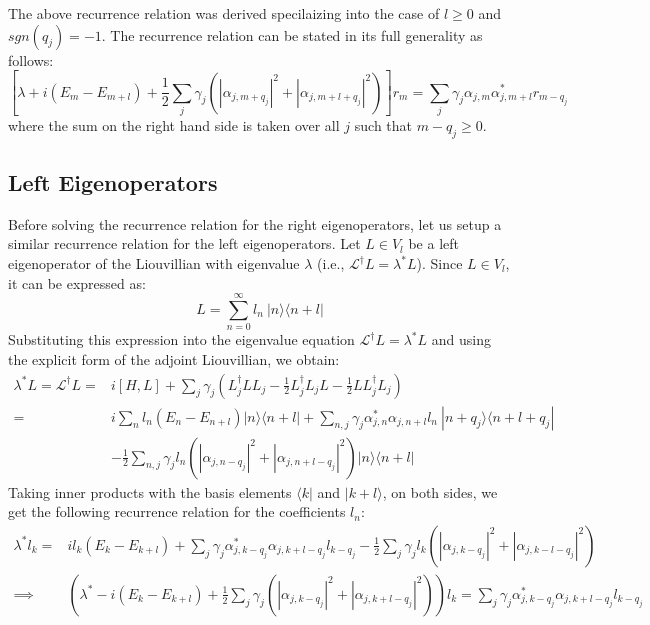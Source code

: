 \documentclass[11pt,a4paper]{article}
\begin{document}
The above recurrence relation was derived specilaizing into the case of $l \geq 0$ and $sgn(q_j) = -1$. The recurrence relation can be stated in its full generality as follows:
\begin{equation}
    \left[ \lambda + i (E_m - E_{m+l}) + \frac{1}{2} \sum_{j} \gamma_j ( |\alpha_{j,m+q_j}|^2 + |\alpha_{j,m+l+q_j}|^2 ) \right] r_m = \sum_{j} \gamma_j \alpha_{j,m } \alpha_{j,m+l}^* r_{m - q_j} 
\end{equation}
where the sum on the right hand side is taken over all $j$ such that $m - q_j \geq 0$.


\subsection{Left Eigenoperators}
Before solving the recurrence relation for the right eigenoperators, let us setup a similar recurrence relation for the left eigenoperators. Let $L \in V_l$ be a left eigenoperator of the Liouvillian with eigenvalue $\lambda$ (i.e., $\mathcal{L}^\dagger L = \lambda^{*} L$). Since $L \in V_l$, it can be expressed as:
\begin{equation}
    L = \sum_{n=0}^{\infty} l_n \ |n\rangle \langle n+l|
\end{equation}
Substituting this expression into the eigenvalue equation $\mathcal{L}^\dagger L = \lambda^{*} L$ and using the explicit form of the adjoint Liouvillian, we obtain:
\begin{align}
    \lambda^{*} L = \mathcal{L}^\dagger L = & i [H, L] + \sum_{j} \gamma_j \left( L_j^\dagger L L_j - \frac{1}{2} L_j^\dagger L_j L - \frac{1}{2} L L_j^\dagger L_j \right) \\
    = & i \sum_{n} l_n (E_n - E_{n+l}) |n\rangle \langle n+l| + \sum_{n,j} \gamma_j \alpha_{j,n}^* \alpha_{j,n+l} l_n \ |n + q_j \rangle \langle n + l + q_j| \nonumber \\
    & - \frac{1}{2} \sum_{n,j} \gamma_j l_n \left( |\alpha_{j,n-q_j}|^2 + |\alpha_{j,n+l-q_j}|^2 \right) |n\rangle \langle n+l|
\end{align}
Taking inner products with the basis elements $\langle k |$ and $|k+l \rangle$, on both sides, we get the following recurrence relation for the coefficients $l_n$:
\begin{align}
    \lambda^{*} l_k = & i l_k (E_k - E_{k+l}) + \sum_{j} \gamma_j \alpha_{j,k-q_j}^* \alpha_{j,k+l-q_j} l_{k - q_j} - \frac{1}{2} \sum_{j} \gamma_j l_k \left( |\alpha_{j,k-q_j}|^2 + |\alpha_{j,k-l-q_j}|^2 \right) \\
    \implies & \left( \lambda^{*} - i (E_k - E_{k+l}) + \frac{1}{2} \sum_{j} \gamma_j \left( |\alpha_{j,k-q_j}|^2 + |\alpha_{j,k+l-q_j}|^2 \right) \right) l_k = \sum_{j} \gamma_j \alpha_{j,k - q_j}^* \alpha_{j,k+l - q_j} l_{k - q_j} \label{left recurrence}
\end{align}
\end{document}
